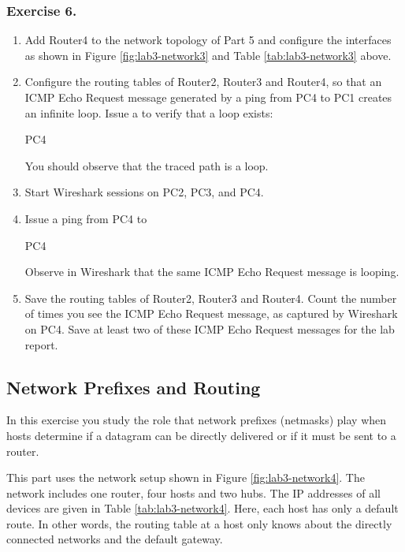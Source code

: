\subsubsection*{Exercise 6.}
\begin{enumerate}
	\item Add Router4 to the network topology of Part 5 and configure the interfaces as shown in Figure \ref{fig:lab3-network3} and Table \ref{tab:lab3-network3} above.
	\item Configure the routing tables of Router2, Router3 and Router4, so that an ICMP Echo Request message generated by a ping from PC4 to PC1 creates an infinite loop. Issue a  to verify that a loop exists:
		\begin{cmdblock}
	PC4%
		\end{cmdblock}
		You should observe that the traced path is a loop.
	\item Start Wireshark sessions on PC2, PC3, and PC4.
	\item Issue a ping from PC4 to
		\begin{cmdblock}
	PC4%
		\end{cmdblock}
		Observe in Wireshark that the same ICMP Echo Request message is looping.
	\item Save the routing tables of Router2, Router3 and Router4. Count the number of times you see the ICMP Echo Request message, as captured by Wireshark on PC4. Save at least two of these ICMP Echo Request messages for the lab report.
\end{enumerate}

\begin{questions}
\end{questions}
	
\newpage	
\subsection{Network Prefixes and Routing}
In this exercise you study the role that network prefixes (netmasks) play when hosts determine if a datagram can be directly delivered or if it must be sent to a router.

This part uses the network setup shown in Figure \ref{fig:lab3-network4}. The network includes one router, four hosts and two hubs. The IP addresses of all devices are given in Table \ref{tab:lab3-network4}. Here, each host has only a default route. In other words, the routing table at a host only knows about the directly connected networks and the default gateway.

